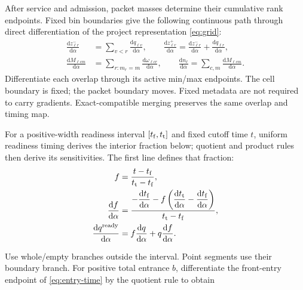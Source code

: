 \documentclass[10pt,a4paper]{article}
\begin{document}
After service and admission, packet masses determine their cumulative
rank endpoints. Fixed bin boundaries give the following continuous path
through direct differentiation of the project representation \eqref{eq:grid}:
\begin{equation}
 \begin{aligned}
 \frac{\mathrm dz^-_{\ell r}}{\mathrm d\alpha}
 &=\sum_{v<r}\frac{\mathrm dq_{\ell v}}{\mathrm d\alpha},\qquad
 \frac{\mathrm dz^+_{\ell r}}{\mathrm d\alpha}
 =\frac{\mathrm dz^-_{\ell r}}{\mathrm d\alpha}
                  +\frac{\mathrm dq_{\ell r}}{\mathrm d\alpha},\\
 \frac{\mathrm dM_{\ell cm}}{\mathrm d\alpha}
 &=\sum_{r:m_r=m}\frac{\mathrm d\omega_{\ell cr}}{\mathrm d\alpha},
 \qquad
 \frac{\mathrm dn_\ell}{\mathrm d\alpha}
 =\sum_{c,m}\frac{\mathrm dM_{\ell cm}}{\mathrm d\alpha}.
 \end{aligned}
 \label{eq:grid-derivative}
\end{equation}
Differentiate each overlap through its active min/max endpoints. The
cell boundary is fixed; the packet boundary moves. Fixed metadata are
not required to carry gradients. Exact-compatible merging preserves the
same overlap and timing map.

\par\begin{samepage}
For a positive-width readiness interval $[t_{\rm f},t_{\rm t}]$ and
fixed cutoff time $t$,
uniform readiness timing derives the interior fraction below; quotient and product rules then derive its sensitivities.
The first line defines that fraction:
\begin{equation}
 \begin{aligned}
 f&=\frac{t-t_{\rm f}}{t_{\rm t}-t_{\rm f}},\\
 \frac{\mathrm df}{\mathrm d\alpha}
 &=\frac{\displaystyle
 -\frac{\mathrm dt_{\rm f}}{\mathrm d\alpha}
 -f\left(\frac{\mathrm dt_{\rm t}}{\mathrm d\alpha}
                 -\frac{\mathrm dt_{\rm f}}{\mathrm d\alpha}\right)}
 {t_{\rm t}-t_{\rm f}},\\
 \frac{\mathrm dq^{\rm ready}}{\mathrm d\alpha}
 &=f\frac{\mathrm dq}{\mathrm d\alpha}
                       +q\frac{\mathrm df}{\mathrm d\alpha}.
 \end{aligned}
 \label{eq:eligibility-derivative}
\end{equation}
\par\end{samepage}

Use whole/empty branches outside the interval. Point segments use their
boundary branch. For positive total entrance $b$, differentiate the
front-entry endpoint of \eqref{eq:entry-time}
by the quotient rule to obtain
\end{document}

